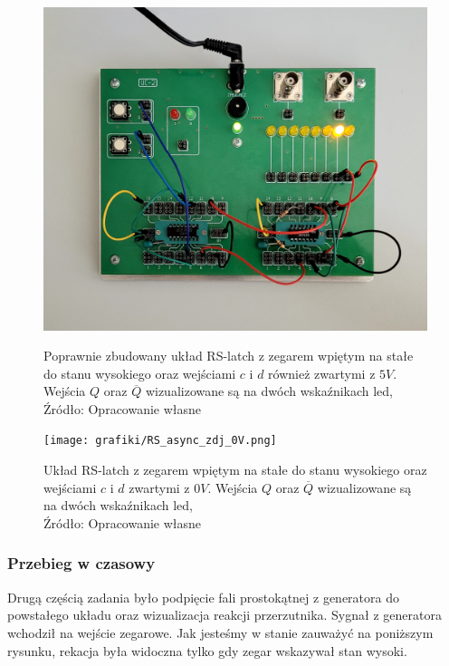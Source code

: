 \documentclass{article}
\begin{document}
        \begin{figure}[!ht]
          \begin{minipage}{.5\textwidth}
            \centering
            \includegraphics[scale=0.06]{grafiki/RS_async_zdj_5V.png}
            \caption{Poprawnie zbudowany układ RS-latch z zegarem wpiętym na stałe do stanu wysokiego oraz wejściami $c$ i $d$ również zwartymi z $5V$. Wejścia $Q$ oraz $\overline{Q}$ wizualizowane są na dwóch wskaźnikach led,
            \\Źródło: Opracowanie własne}
          \end{minipage}
          \begin{minipage}{.5\textwidth}
            \centering
            \texttt{[image: grafiki/RS\_async\_zdj\_0V.png]}
            \caption{Układ RS-latch z zegarem wpiętym na stałe do stanu wysokiego oraz wejściami $c$ i $d$ zwartymi z $0V$. Wejścia $Q$ oraz $\overline{Q}$ wizualizowane są na dwóch wskaźnikach led,
            \\Źródło: Opracowanie własne}
          \end{minipage}
        \end{figure}

      \subsubsection{Przebieg w czasowy}
        Drugą częścią zadania było podpięcie fali prostokątnej z generatora do powstałego układu oraz wizualizacja reakcji przerzutnika. Sygnał z generatora wchodził na wejście zegarowe. Jak jesteśmy w stanie zauważyć na poniższym rysunku, rekacja była widoczna tylko gdy zegar wskazywał stan wysoki.
\end{document}
